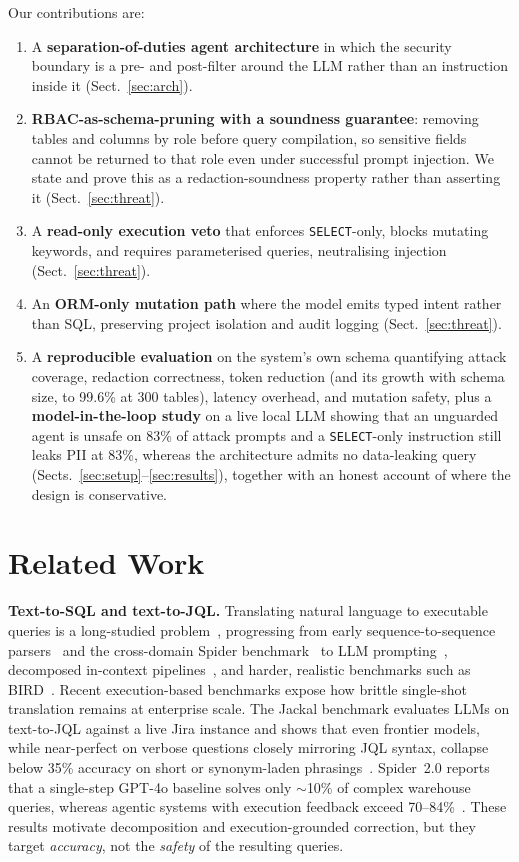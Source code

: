 \documentclass[runningheads]{llncs}
\begin{document}
Our contributions are:
\begin{enumerate}
\item A \textbf{separation-of-duties agent architecture} in which the security boundary is a pre- and post-filter around the LLM rather than an instruction inside it (Sect.~\ref{sec:arch}).
\item \textbf{RBAC-as-schema-pruning with a soundness guarantee}: removing tables and columns by role before query compilation, so sensitive fields cannot be returned to that role even under successful prompt injection. We state and prove this as a redaction-soundness property rather than asserting it (Sect.~\ref{sec:threat}).
\item A \textbf{read-only execution veto} that enforces \texttt{SELECT}-only, blocks mutating keywords, and requires parameterised queries, neutralising injection (Sect.~\ref{sec:threat}).
\item An \textbf{ORM-only mutation path} where the model emits typed intent rather than SQL, preserving project isolation and audit logging (Sect.~\ref{sec:threat}).
\item A \textbf{reproducible evaluation} on the system's own schema quantifying attack coverage, redaction correctness, token reduction (and its growth with schema size, to 99.6\% at 300 tables), latency overhead, and mutation safety, plus a \textbf{model-in-the-loop study} on a live local LLM showing that an unguarded agent is unsafe on 83\% of attack prompts and a \texttt{SELECT}-only instruction still leaks PII at 83\%, whereas the architecture admits no data-leaking query (Sects.~\ref{sec:setup}--\ref{sec:results}), together with an honest account of where the design is conservative.
\end{enumerate}

\section{Related Work}
\textbf{Text-to-SQL and text-to-JQL.} Translating natural language to executable queries is a long-studied problem~\cite{textsql-survey,katsogiannis2023survey}, progressing from early sequence-to-sequence parsers~\cite{zhong2017seq2sql} and the cross-domain Spider benchmark~\cite{yu2018spider} to LLM prompting~\cite{rajkumar2022evaluating}, decomposed in-context pipelines~\cite{pourreza2023dinsql,gao2024dailsql}, and harder, realistic benchmarks such as BIRD~\cite{li2023bird}. Recent execution-based benchmarks expose how brittle single-shot translation remains at enterprise scale. The Jackal benchmark evaluates LLMs on text-to-JQL against a live Jira instance and shows that even frontier models, while near-perfect on verbose questions closely mirroring JQL syntax, collapse below 35\% accuracy on short or synonym-laden phrasings~\cite{jackal}. Spider~2.0 reports that a single-step GPT-4o baseline solves only $\sim$10\% of complex warehouse queries, whereas agentic systems with execution feedback exceed 70--84\%~\cite{spider2}. These results motivate decomposition and execution-grounded correction, but they target \emph{accuracy}, not the \emph{safety} of the resulting queries.
\end{document}

